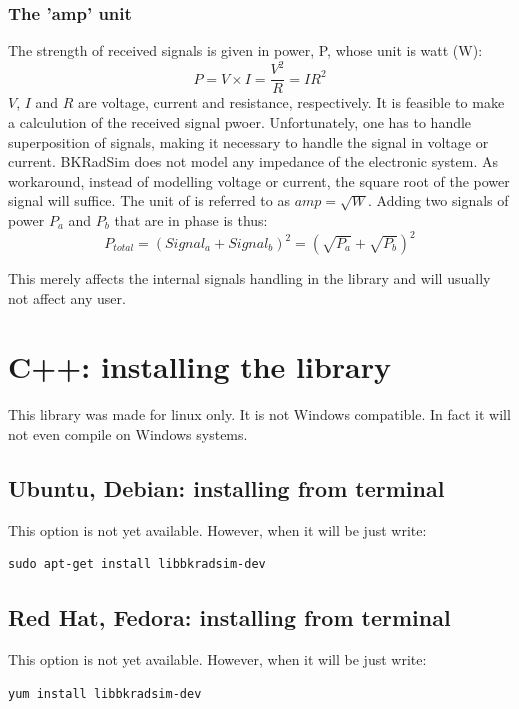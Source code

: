 \documentclass[letterpaper]{book}
\begin{document}
\subsection{The 'amp' unit}
The strength of received signals is given in power, P, whose unit is watt (W):
\begin{equation}
P = V \times I = \frac{V^{2}}{R} = IR^{2}
\end{equation}
\(V\), \(I\) and \(R\) are voltage, current and resistance, respectively. It is feasible to make a calculution of the received signal pwoer. Unfortunately, one has to handle superposition of signals, making it necessary to handle the signal in voltage or current. BKRadSim does not model any impedance of the electronic system. As workaround, instead of modelling voltage or current, the square root of the power signal will suffice. The unit of is referred to as \(amp=\sqrt{W}\). Adding two signals of power \(P_{a}\) and \(P_{b}\) that are in phase is thus:
\begin{equation}
P_{total}=(Signal_{a} + Signal_{b})^{2}=(\sqrt{P_{a}}+\sqrt{P_{b}})^{2}
\end{equation}

This merely affects the internal signals handling in the library and will usually not affect any user. 



\chapter{C++: installing the library}
This library was made for linux only. It is not Windows compatible. In fact it will not even compile on Windows systems. 
\section{Ubuntu, Debian: installing from terminal}
This option is not yet available. However, when it will be just write:
\begin{lstlisting}
sudo apt-get install libbkradsim-dev
\end{lstlisting}
\section{Red Hat, Fedora: installing from terminal}
This option is not yet available. However, when it will be just write:
\begin{lstlisting}
yum install libbkradsim-dev
\end{lstlisting}
\end{document}
